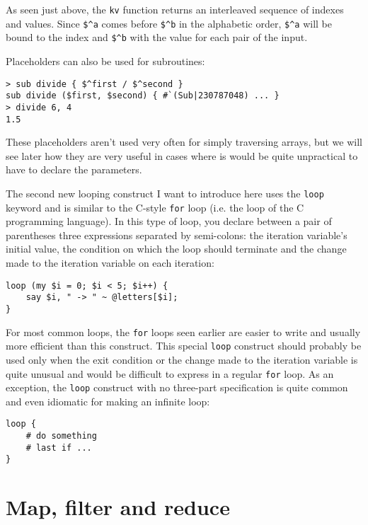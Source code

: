 As seen just above, the {\tt kv} function returns an 
interleaved sequence of indexes and values. Since 
\verb'$^a' comes before \verb'$^b' in the alphabetic 
order, \verb'$^a' will be bound to the index and 
\verb'$^b' with the value for each pair of the input.

Placeholders can also be used for subroutines:

\begin{verbatim}
> sub divide { $^first / $^second }
sub divide ($first, $second) { #`(Sub|230787048) ... }
> divide 6, 4
1.5
\end{verbatim}
%

These placeholders aren't used very often for 
simply traversing arrays, but we will see later how  
they are very useful in cases where is would be quite 
unpractical to have to declare the parameters.

\label{C-style loop}
The second new looping construct I want to introduce 
here uses the {\tt loop} keyword and is similar to 
the C-style {\tt for} loop (i.e. the loop of the 
C programming language). In this type of loop, you 
declare between a pair of parentheses three expressions 
separated by semi-colons: the iteration variable's 
initial value, the condition on which the loop should 
terminate and the change made to the iteration variable on 
each iteration:

\begin{verbatim}
loop (my $i = 0; $i < 5; $i++) {
    say $i, " -> " ~ @letters[$i];
}
\end{verbatim}
%
For most common loops, the {\tt for} loops seen earlier 
are easier to write and usually more efficient than this 
construct. This special {\tt loop} construct should probably 
be used only when the exit condition or the change made to 
the iteration variable is quite unusual and would 
be difficult to express in a regular {\tt for} loop. As 
an exception, the {\tt loop} construct with no 
three-part specification is quite common and even 
idiomatic for making an infinite loop:

\begin{verbatim}
loop {
    # do something 
    # last if ...
}
\end{verbatim}
%


\section{Map, filter and reduce}
\label{map_filter}

